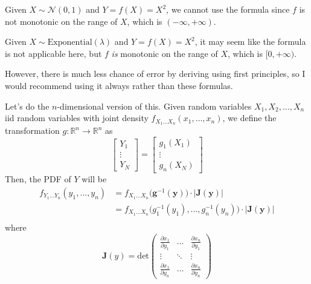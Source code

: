     \begin{example}
      Given $X \sim \mathcal{N}(0, 1)$ and $Y = f(X) = X^2$, we cannot use the formula since $f$ is not monotonic on the range of $X$, which is $(-\infty, +\infty)$.  
    \end{example}

    \begin{example}
      Given $X \sim \mathrm{Exponential}(\lambda)$ and $Y = f(X) = X^2$, it may seem like the formula is not applicable here, but $f$ \textit{is} monotonic on the range of $X$, which is $[0, + \infty)$. 
    \end{example}

    However, there is much less chance of error by deriving using first principles, so I would recommend using it always rather than these formulas. 

    Let's do the $n$-dimensional version of this. Given random variables $X_1, X_2, \ldots, X_n$ iid random variables with joint density $f_{X_1 \ldots X_n} (x_1, \ldots, x_n)$, we define the transformation $g: \mathbb{R}^n \rightarrow \mathbb{R}^n$ as 
    \begin{equation}
      \begin{bmatrix} Y_1 \\ \vdots \\ Y_N \end{bmatrix} = \begin{bmatrix} g_1 (X_1) \\ \vdots \\ g_n (X_N) \end{bmatrix}
    \end{equation}
    Then, the PDF of $Y$ will be 
    \begin{align*}
      f_{Y_1 \ldots Y_n} (y_1, \ldots, y_n) & = f_{X_1 \ldots X_n} \big( \mathbf{g}^{-1} (\mathbf{y}) \big) \cdot | \mathbf{J}(\mathbf{y})| \\
      & = f_{X_1 \ldots X_n} \big( g_1^{-1}(y_1), \ldots, g_n^{-1} (y_n) \big) \cdot | \mathbf{J}(\mathbf{y})| \\
    \end{align*}
    where 
    \begin{equation}
      \mathbf{J}(y) = \mathrm{det}\begin{pmatrix} 
      \frac{\partial x_1}{\partial y_1} & \ldots & \frac{\partial x_n}{\partial y_1} \\
      \vdots & \ddots & \vdots \\ 
      \frac{\partial x_1}{\partial y_n} & \ldots & \frac{\partial x_n}{\partial y_n} \end{pmatrix}
    \end{equation}

